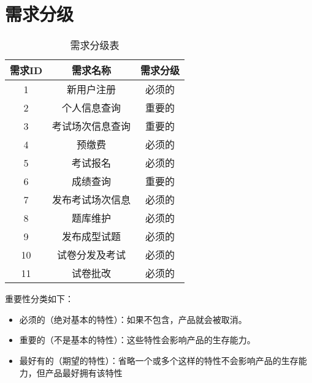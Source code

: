 \chapter{需求分级}
\begin{table}[htbp]
\centering
\caption{需求分级表} \label{tab:classification}
\begin{tabular}{|c|c|c|}
    \hline
    需求ID & 需求名称 & 需求分级 \\
    \hline
    1 & 新用户注册 & 必须的 \\
    \hline
    2 & 个人信息查询 & 重要的 \\
    \hline
    3 & 考试场次信息查询 & 重要的 \\
    \hline
    4 & 预缴费 & 必须的 \\
    \hline
    5 & 考试报名 & 必须的 \\
    \hline
    6 & 成绩查询 & 重要的 \\
    \hline
    7 & 发布考试场次信息 & 必须的 \\
    \hline
    8 & 题库维护 & 必须的 \\
    \hline
    9 & 发布成型试题 & 必须的 \\
    \hline
    10 & 试卷分发及考试 &  必须的 \\
    \hline
    11 & 试卷批改 &  必须的 \\
    \hline
\end{tabular}
\end{table}

重要性分类如下：
\begin{itemize}
\item 必须的（绝对基本的特性）：如果不包含，产品就会被取消。
\item 重要的（不是基本的特性）：这些特性会影响产品的生存能力。
\item 最好有的（期望的特性）：省略一个或多个这样的特性不会影响产品的生存能力，但产品最好拥有该特性
\end{itemize}
